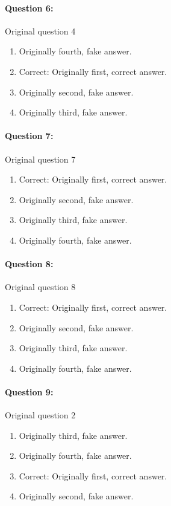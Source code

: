 \documentclass[9pt, twoside, twocolumn]{extarticle}
\begin{document}
\paragraph{Question 6:}
Original question 4

\begin{enumerate}[label=\textbf{{\Alph*}},labelindent=0pt, labelsep=1.5em, parsep=0.2em]
\item Originally fourth, fake answer.
\item Correct: Originally first, correct answer.
\item Originally second, fake answer.
\item Originally third, fake answer.
\end{enumerate}
\paragraph{Question 7:}
Original question 7

\begin{enumerate}[label=\textbf{{\Alph*}},labelindent=0pt, labelsep=1.5em, parsep=0.2em]
\item Correct: Originally first, correct answer.
\item Originally second, fake answer.
\item Originally third, fake answer.
\item Originally fourth, fake answer.
\end{enumerate}
\paragraph{Question 8:}
Original question 8

\begin{enumerate}[label=\textbf{{\Alph*}},labelindent=0pt, labelsep=1.5em, parsep=0.2em]
\item Correct: Originally first, correct answer.
\item Originally second, fake answer.
\item Originally third, fake answer.
\item Originally fourth, fake answer.
\end{enumerate}
\paragraph{Question 9:}
Original question 2

\begin{enumerate}[label=\textbf{{\Alph*}},labelindent=0pt, labelsep=1.5em, parsep=0.2em]
\item Originally third, fake answer.
\item Originally fourth, fake answer.
\item Correct: Originally first, correct answer.
\item Originally second, fake answer.
\end{enumerate}
\end{document}
